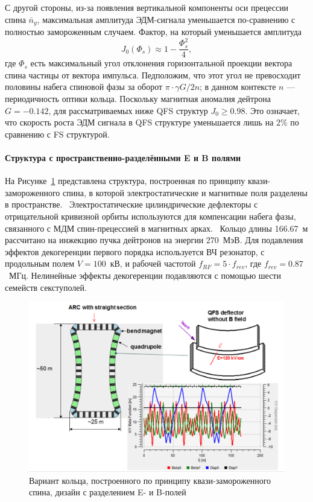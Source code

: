 С другой стороны, из-за появления вертикальной компоненты оси прецессии спина $\bar n_y$, максимальная амплитуда ЭДМ-сигнала уменьшается по-сравнению с полностью замороженным случаем. Фактор, на который уменьшается амплитуда~\cite{Senichev:QFS_IPAC15}
\[
J_0(\Phi_s) \approx 1 - \frac{\Phi_s^2}{4},
\]
где $\Phi_s$ есть максимальный угол отклонения горизонтальной проекции вектора спина частицы от вектора импульса. Педположим, что этот угол не превосходит половины набега спиновой фазы за оборот ${\pi\cdot \gamma G/2n}$; в данном контексте $n$ --- периодичность оптики кольца. Поскольку магнитная аномалия дейтрона 
${G = -0.142}$, для рассматриваемых ниже QFS структур ${J_0\ge 0.98}$.
Это означает, что скорость роста ЭДМ сигнала в QFS структуре уменьшается лишь на 2\% по сравнению с  FS структурой. 

\paragraph{Структура с пространственно-разделёнными E и B полями}\label{chpt2:lattice:QFS:6_3}

На Рисунке~\ref{fig:QFS_6_3_lattice} представлена структура, построенная по принципу 
квази-замороженного спина, в которой электростатические и магнитные поля 
разделены в пространстве.~\cite{Senichev:Lattices} Электростатические цилиндрические дефлекторы 
с отрицательной кривизной орбиты используются для компенсации набега фазы, 
связанного с МДМ спин-прецессией в магнитных арках.~\cite{Senichev:QFS_IPAC15} 
Кольцо длины 166.67~м рассчитано на инжекцию пучка дейтронов на энергии 270~МэВ. 
Для подавления эффектов декогеренции первого порядка используется ВЧ резонатор, 
с продольным полем ${V = 100}$~кВ, и рабочей частотой ${f_{RF} = 5\cdot f_{rev}}$, 
где ${f_{rev} = 0.87}$~МГц. Нелинейные эффекты декогеренции подавляются с помощью шести семейств секступолей.

\begin{figure}[H]
	\centering
	\includegraphics[width=\linewidth]{images/chapter2/6_3_lattice}
	\caption{Вариант кольца, построенного по принципу квази-замороженного спина, 
		дизайн с разделением E- и B-полей
	\label{fig:QFS_6_3_lattice}}
\end{figure}

